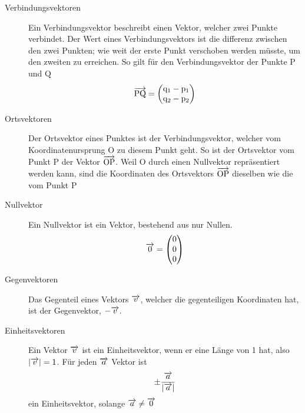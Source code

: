 \documentclass{article}
\begin{document}
\vspace{1em} 
\noindent \begin{minipage}{\dimexpr\textwidth-5cm}
 \begin{description}
  \item[Verbindungsvektoren] Ein Verbindungsvektor beschreibt einen Vektor, welcher zwei Punkte verbindet. Der Wert eines Verbindungsvektors ist die differenz zwischen den zwei Punkten; wie weit der erste Punkt verschoben werden müsste, um den zweiten zu erreichen. So gilt für den Verbindungsvektor der Punkte $\mathrm{P}$ und $\mathrm{Q}$
\[
 \overrightarrow{\mathrm{PQ}} =
 \begin{pmatrix}
  \mathrm{q}_1 - \mathrm{p}_1 \\
  \mathrm{q}_2 - \mathrm{p}_2
 \end{pmatrix}
\] 
 \end{description} 
\end{minipage}
\hfill
\begin{minipage}{5cm}
  \centering
\end{minipage} 
\begin{description} 
 \item[Ortsvektoren] Der Ortsvektor eines Punktes ist der Verbindungsvektor, welcher vom Koordinatenursprung $\mathrm{O}$ zu diesem Punkt geht. So ist der Ortsvektor vom Punkt $\mathrm{P}$ der Vektor $\overrightarrow{\mathrm{OP}}$. Weil $\mathrm{O}$ durch einen Nullvektor repräsentiert werden kann, sind die Koordinaten des Ortsvektors $\overrightarrow{\mathrm{OP}}$ dieselben wie die vom Punkt $\mathrm{P}$
  \item[Nullvektor] Ein Nullvektor ist ein Vektor, bestehend aus nur Nullen.
\[
 \overrightarrow{0} = \begin{pmatrix} 0 \\ 0 \\ 0 \end{pmatrix}
\] 
 \item[Gegenvektoren] Das Gegenteil eines Vektors $\overrightarrow{v}$, welcher die gegenteiligen Koordinaten hat, ist der Gegenvektor, $-\overrightarrow{v}$.
 \item[Einheitsvektoren] Ein Vektor $\overrightarrow{v}$ ist ein Einheitsvektor, wenn er eine Länge von 1 hat, also $\left| {\overrightarrow{v}} \right| = 1$. Für jeden $\overrightarrow{a}$ Vektor ist
\[
 \pm \frac{\overrightarrow{a}}{\left| {\overrightarrow{a}} \right|} 
\]
ein Einheitsvektor, solange $\overrightarrow{a} \neq \overrightarrow{0}$
\end{description} 
 
\end{document}
